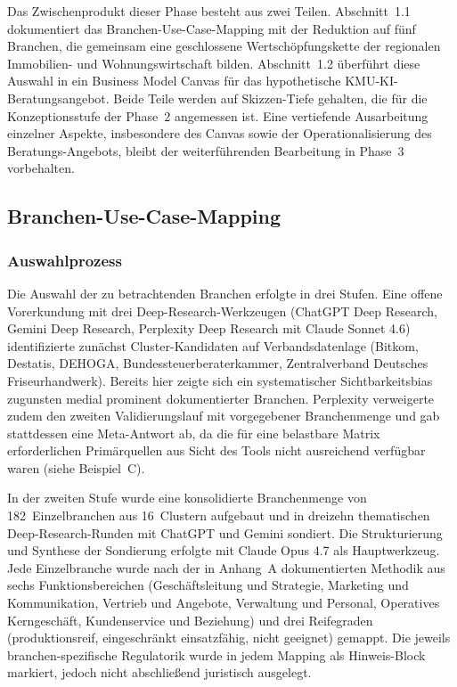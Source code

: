 \documentclass[a4paper,11pt]{article}
\begin{document}
Das Zwischenprodukt dieser Phase besteht aus zwei Teilen. Abschnitt~1.1
dokumentiert das Branchen-Use-Case-Mapping mit der Reduktion auf fünf
Branchen, die gemeinsam eine geschlossene Wertschöpfungskette der
regionalen Immobilien- und Wohnungswirtschaft bilden. Abschnitt~1.2
überführt diese Auswahl in ein Business Model Canvas für das
hypothetische KMU-KI-Beratungsangebot. Beide Teile werden auf
Skizzen-Tiefe gehalten, die für die Konzeptionsstufe der Phase~2
angemessen ist. Eine vertiefende Ausarbeitung einzelner Aspekte,
insbesondere des Canvas sowie der Operationalisierung des
Beratungs-Angebots, bleibt der weiterführenden Bearbeitung in Phase~3
vorbehalten.

\subsection{Branchen-Use-Case-Mapping}

\subsubsection{Auswahlprozess}

Die Auswahl der zu betrachtenden Branchen erfolgte in drei Stufen. Eine
offene Vorerkundung mit drei Deep-Research-Werkzeugen (ChatGPT Deep
Research, Gemini Deep Research, Perplexity Deep Research mit Claude
Sonnet 4.6) identifizierte zunächst Cluster-Kandidaten auf
Verbandsdatenlage (Bitkom, Destatis, DEHOGA, Bundessteuerberaterkammer,
Zentralverband Deutsches Friseurhandwerk). Bereits hier zeigte sich
ein systematischer Sichtbarkeitsbias zugunsten medial prominent
dokumentierter Branchen. Perplexity verweigerte zudem den zweiten
Validierungs\-lauf mit vorgegebener Branchenmenge und gab
stattdessen eine Meta-Antwort ab, da die für eine belastbare Matrix
erforderlichen Primärquellen aus Sicht des Tools nicht ausreichend
verfügbar waren (siehe Beispiel~C).

In der zweiten Stufe wurde eine konsolidierte Branchenmenge von
182~Einzelbranchen aus 16~Clustern aufgebaut und in dreizehn
thematischen Deep-Research-Runden mit ChatGPT und Gemini sondiert. Die
Strukturierung und Synthese der Sondierung erfolgte mit Claude Opus 4.7
als Hauptwerkzeug. Jede Einzelbranche wurde nach der in Anhang~A
dokumentierten Methodik aus sechs Funktionsbereichen (Geschäftsleitung
und Strategie, Marketing und Kommunikation, Vertrieb und Angebote,
Verwaltung und Personal, Operatives Kerngeschäft, Kundenservice und
Beziehung) und drei Reifegraden (produktionsreif, eingeschränkt
einsatzfähig, nicht geeignet) gemappt. Die jeweils branchen-spezifische
Regulatorik wurde in jedem Mapping als Hinweis-Block markiert, jedoch
nicht abschließend juristisch ausgelegt.
\end{document}
